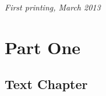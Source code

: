 \documentclass[11pt,fleqn]{book} %
\begin{document}
\noindent \textit{First printing, March 2013} %




\pagestyle{empty} %

\tableofcontents %

\cleardoublepage %

\pagestyle{fancy} %


\part{Part One}



\chapter{Text Chapter}
\end{document}
